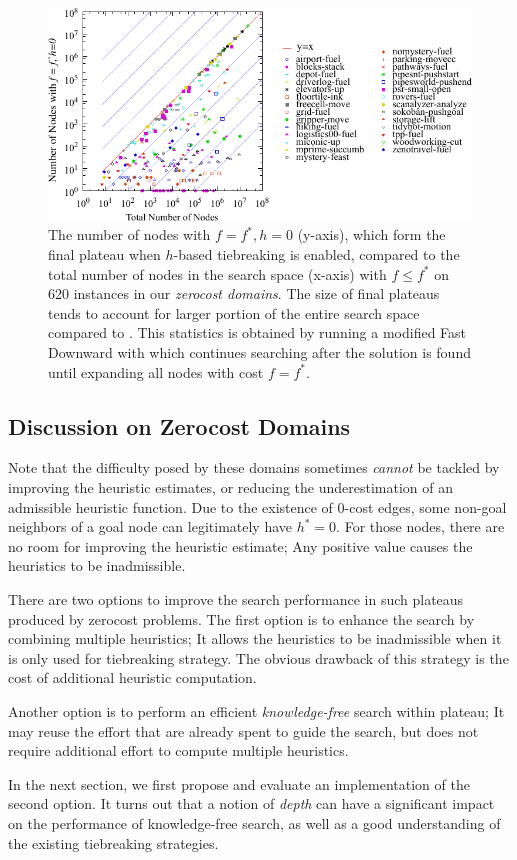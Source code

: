 \begin{figure}[htbp]
  \centering
  \includegraphics{tables/aaai16-frontier/zerocost/lmcut_frontier-front.pdf}
  \caption{
 The number of nodes with $f=f^*, h=0$ (y-axis), which form
  the final plateau when $h$-based tiebreaking is enabled, compared to
 the total number of nodes in the search space (x-axis) with
 $f\leq f^*$ on 620 instances in our \emph{zerocost domains}.
 The size of final plateaus tends to account for larger portion of the
 entire search space compared to .
 This statistics is obtained by running a modified Fast Downward with
 \lmcut which continues searching after the solution is found
 until expanding all nodes with cost $f=f^*$.
 }
 \label{fig:plateau-zerocost}
\end{figure}

\subsection{Discussion on Zerocost Domains}

Note that the difficulty posed by these domains sometimes \emph{cannot}
be tackled by improving the heuristic estimates, or reducing the
underestimation of an admissible heuristic function.  Due to the
existence of 0-cost edges, some non-goal neighbors of a goal node can
legitimately have $h^*=0$. For those nodes,
there are no room for improving the heuristic estimate; Any positive
value causes the heuristics to be inadmissible.

There are two options to improve the search performance in such plateaus
produced by zerocost problems. The first option is to enhance the search
by combining multiple heuristics; It allows the heuristics to be
inadmissible when it is only used for tiebreaking strategy. The obvious
drawback of this strategy is the cost of additional heuristic
computation.

Another option is to perform an efficient
\emph{knowledge-free} search within plateau; It may reuse the effort
that are already spent to guide the search, but does not require
additional effort to compute multiple heuristics.

In the next section, we first propose and evaluate an implementation of
the second option.  It turns out that a notion of \emph{depth} can have
a significant impact on the performance of knowledge-free search, as
well as a good understanding of the existing tiebreaking strategies.

